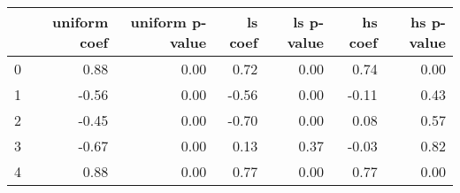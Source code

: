 \begin{tabular}{lrrrrrr}
\toprule
 & uniform coef & uniform p-value & ls coef & ls p-value & hs coef & hs p-value \\
\midrule
0 & 0.88 & 0.00 & 0.72 & 0.00 & 0.74 & 0.00 \\
1 & -0.56 & 0.00 & -0.56 & 0.00 & -0.11 & 0.43 \\
2 & -0.45 & 0.00 & -0.70 & 0.00 & 0.08 & 0.57 \\
3 & -0.67 & 0.00 & 0.13 & 0.37 & -0.03 & 0.82 \\
4 & 0.88 & 0.00 & 0.77 & 0.00 & 0.77 & 0.00 \\
\bottomrule
\end{tabular}
